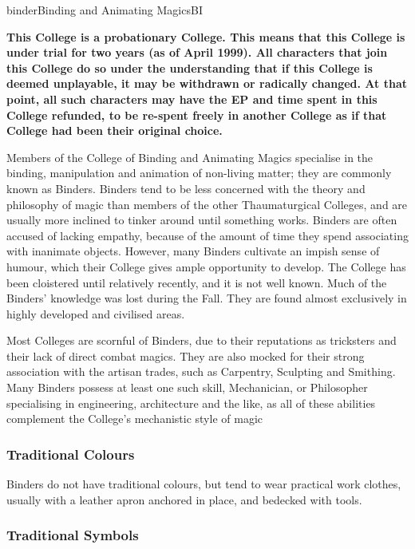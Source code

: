 \begin{college}[1.1]{binder}{Binding and Animating Magics}{BI}

\textbf{This College is a probationary College. This means that this
College is under trial for two years (as of April 1999). All characters
that join this College do so under the understanding that if this
College is deemed unplayable, it may be withdrawn or radically
changed. At that point, all such characters may have the EP and time
spent in this College refunded, to be re-spent freely in another
College as if that College had been their original choice.}

Members of the College of Binding and Animating Magics specialise in
the binding, manipulation and animation of non-living matter; they are
commonly known as Binders. Binders tend to be less concerned with the
theory and philosophy of magic than members of the other
Thaumaturgical Colleges, and are usually more inclined to tinker
around until something works. Binders are often accused of lacking
empathy, because of the amount of time they spend associating with
inanimate objects. However, many Binders cultivate an impish sense of
humour, which their College gives ample opportunity to develop. The
College has been cloistered until relatively recently, and it is not
well known. Much of the Binders' knowledge was lost during the Fall.
They are found almost exclusively in highly developed and civilised
areas.

Most Colleges are scornful of Binders, due to their reputations as
tricksters and their lack of direct combat magics.  They are also
mocked for their strong association with the artisan trades, such as
Carpentry, Sculpting and Smithing. Many Binders possess at least one
such skill, Mechanician, or Philosopher specialising in engineering,
architecture and the like, as all of these abilities complement the
College's mechanistic style of magic

\subsubsection{Traditional Colours}

Binders do not have traditional colours, but tend to wear practical
work clothes, usually with a leather apron anchored in place, and
bedecked with tools.

\subsubsection{Traditional Symbols}


\end{college}
